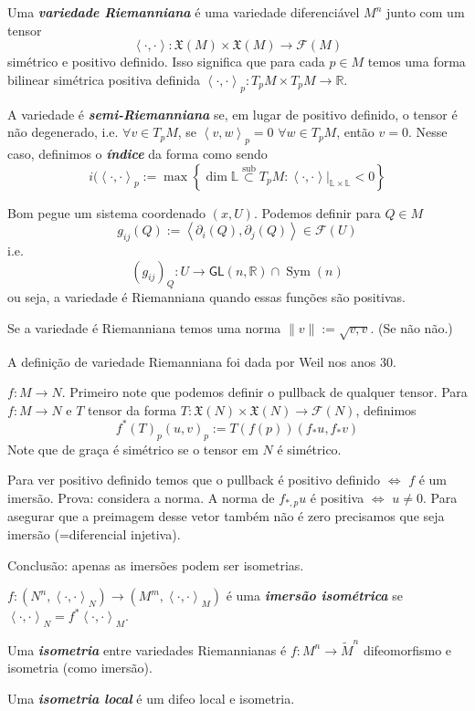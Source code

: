 \begin{defn}\leavevmode
Uma \textit{\textbf{variedade Riemanniana}} é uma variedade diferenciável \(M^n\) junto com um tensor
\[\left<\cdot,\cdot\right>: \mathfrak{X}(M) \times \mathfrak{X}(M) \longrightarrow \mathcal{F}(M)\]
simétrico e positivo definido. Isso significa que para cada \(p \in M\) temos uma forma bilinear simétrica positiva definida \(\left<\cdot,\cdot\right>_p:T_pM \times T_pM \longrightarrow \mathbb{R}\).

A variedade é \textit{\textbf{semi-Riemanniana}} se, em lugar de positivo definido, o tensor é não degenerado, i.e. \(\forall v \in T_pM\), se \(\left<v,w\right>_p=0\) \(\forall w \in T_pM\), então \(v =0\). Nesse caso, definimos o \textit{\textbf{índice}} da forma como sendo
\[i(\left<\cdot,\cdot\right>_p:=\operatorname{max}\left\{ \dim \mathbb{L} \overset{\text{sub} }{\subset} T_pM:\left<\cdot,\cdot\right>|_{\mathbb{L}\times\mathbb{L}}<0\right\} \]

Bom pegue um sistema coordenado \((x,U)\). Podemos definir para \(Q \in M\)
\[g_{ij}(Q):=\left<\partial_i(Q),\partial_j(Q)\right> \in \mathcal{F}(U)\]
i.e.
\[(g_{ij})_Q:U \longrightarrow \mathsf{GL}(n,\mathbb{R}) \cap \operatorname{Sym}(n)\]
ou seja, a variedade é Riemanniana quando essas funções são positivas.

Se a variedade é Riemanniana temos uma norma \(\|v\|:=\sqrt{v,v} \). (Se não não.)
\end{defn}

\begin{remark}\leavevmode
A definição de variedade Riemanniana foi dada por Weil nos anos 30.
\end{remark}

\begin{defn}[Isometrias]\leavevmode
\(f:M \to N\). Primeiro note que podemos definir o pullback de qualquer tensor. Para \(f:M \to N\) e \(T\) tensor da forma \(T: \mathfrak{X}(N)\times \mathfrak{X}(N) \longrightarrow \mathcal{F}(N)\), definimos
\[f^*(T)_p(u,v)_p:=T(f(p))(f_*u,f_*v)\]
Note que de graça é simétrico se o tensor em \(N\) é simétrico.

Para ver positivo definido temos que o pullback é positivo definido \(\iff\) \(f\) é um imersão. Prova: considera a norma. A norma de \(f_{*,p}u\) é positiva \(\iff\) \(u \neq 0\). Para asegurar que a preimagem desse vetor também  não é zero precisamos que seja imersão (=diferencial injetiva).

{\color{7}Conclusão:} apenas as imersões podem ser isometrias.

\(f:(N^n,\left<\cdot,\cdot\right>_N)\longrightarrow (M^m,\left<\cdot,\cdot\right>_M)\) é uma \textit{\textbf{imersão isométrica}} se \(\left<\cdot,\cdot\right>_N=f^*\left<\cdot,\cdot\right>_M\).

Uma \textit{\textbf{isometria}} entre variedades Riemannianas é \(f:M^n \to \tilde{M}^n\) difeomorfismo e isometria (como imersão).

Uma \textit{\textbf{isometria local}} é um difeo local e isometria.
\end{defn}

